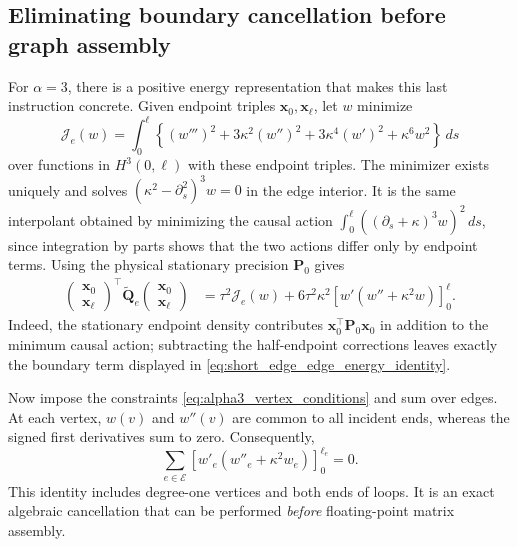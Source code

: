 \documentclass[11pt,a4paper]{article}
\theoremstyle{plain}
\theoremstyle{definition}
\begin{document}
\subsection{Eliminating boundary cancellation before graph assembly}
\label{sec:short_edge_graph_solution}

For $\alpha=3$, there is a positive energy representation that makes
this last instruction concrete. Given endpoint triples
$\mathbf x_0,\mathbf x_\ell$, let $w$ minimize
\begin{equation}
\mathcal J_e(w)=\int_0^\ell
 \left\{(w''')^2+3\kappa^2(w'')^2
             +3\kappa^4(w')^2+\kappa^6w^2\right\}\,ds
\label{eq:short_edge_positive_energy}
\end{equation}
over functions in $H^3(0,\ell)$ with these endpoint triples.
The minimizer exists uniquely and solves
$(\kappa^2-\partial_s^2)^3w=0$ in the edge interior.
It is the same interpolant obtained by minimizing the causal action
$\int_0^\ell((\partial_s+\kappa)^3w)^2\,ds$, since integration by
parts shows that the two actions differ only by endpoint terms.
Using the physical stationary precision $\mathbf P_0$ gives
\begin{align}
\begin{pmatrix}\mathbf x_0\\\mathbf x_\ell\end{pmatrix}^{\!\top}
\widetilde{\mathbf Q}_e
\begin{pmatrix}\mathbf x_0\\\mathbf x_\ell\end{pmatrix}
&=\tau^2\mathcal J_e(w)
 +6\tau^2\kappa^2
   \left[w'(w''+\kappa^2w)\right]_0^\ell.
\label{eq:short_edge_edge_energy_identity}
\end{align}
Indeed, the stationary endpoint density contributes
$\mathbf x_0^\top\mathbf P_0\mathbf x_0$ in addition to the minimum
causal action; subtracting the half-endpoint corrections leaves exactly
the boundary term displayed in
\eqref{eq:short_edge_edge_energy_identity}.

Now impose the constraints \eqref{eq:alpha3_vertex_conditions} and sum
over edges. At each vertex, $w(v)$ and $w''(v)$ are common to all
incident ends, whereas the signed first derivatives sum to zero.
Consequently,
\begin{equation}
\sum_{e\in\mathcal E}
 \left[w'_e(w''_e+\kappa^2w_e)\right]_0^{\ell_e}=0.
\label{eq:short_edge_boundary_cancellation}
\end{equation}
This identity includes degree-one vertices and both ends of loops.
It is an exact algebraic cancellation that can be performed
\emph{before} floating-point matrix assembly.
\end{document}
